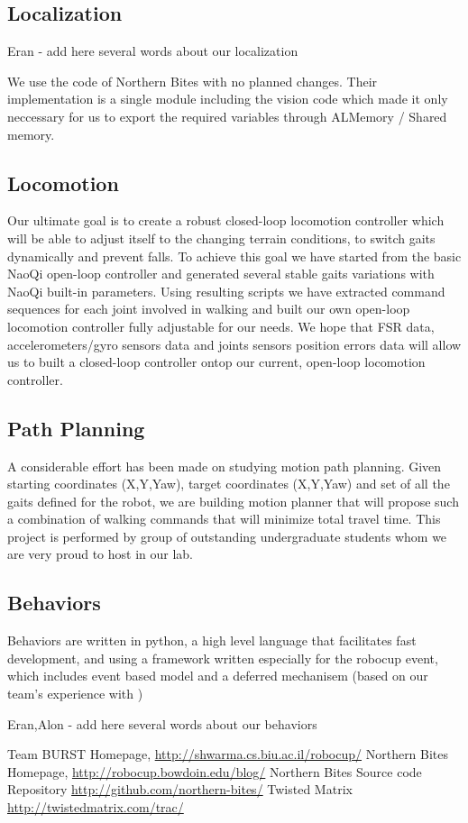 \documentclass[runningheads,a4paper]{llncs}
\begin{document}
\subsection{Localization}
\label{localization}
Eran - add here several words about our localization

We use the code of Northern Bites \cite{northern,northern-repo} with no planned changes. Their implementation is a single module including the vision code which made it only neccessary for us to export the required variables through ALMemory / Shared memory.

\subsection{Locomotion}
Our ultimate goal is to create a robust closed-loop locomotion controller which will be able to adjust itself to the changing terrain conditions, to switch gaits dynamically and prevent falls. To achieve this goal we have started from the basic NaoQi open-loop controller and generated several stable gaits variations with NaoQi built-in parameters. Using resulting scripts we have extracted command sequences for each joint involved in walking and built our own open-loop locomotion controller fully adjustable for our needs. We hope that FSR data, accelerometers/gyro sensors data and joints sensors position errors data will allow us to built a closed-loop controller ontop our current, open-loop locomotion controller.

\subsection{Path Planning}
A considerable effort has been made on studying motion path planning. Given starting coordinates (X,Y,Yaw), target coordinates (X,Y,Yaw) and set of all the gaits defined for the robot, we are building motion planner that will propose such a combination of walking commands that will minimize total travel time. This project is performed by group of outstanding undergraduate students whom we are very proud to host in our lab.

\subsection{Behaviors}
\label{behavior}
Behaviors are written in python, a high level language that facilitates fast development, and using a framework written especially for the robocup event, which includes event based model and a deferred mechanisem (based on our team's experience with \cite{twisted})

Eran,Alon - add here several words about our behaviors

\label{references}


\begin{thebibliography}{4}

 Team BURST Homepage, \url{http://shwarma.cs.biu.ac.il/robocup/}
 Northern Bites Homepage,
\url{http://robocup.bowdoin.edu/blog/}
 Northern Bites Source code Repository
\url{http://github.com/northern-bites/}
 Twisted Matrix
\url{http://twistedmatrix.com/trac/}
\end{thebibliography}
\end{document}
